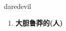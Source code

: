 
\begin{frame}
{\huge daredevil}
\begin{center}
\begin{enumerate}\Large
  \item \textbf{大胆鲁莽的(人)}
\end{enumerate}
\end{center}
\end{frame}
